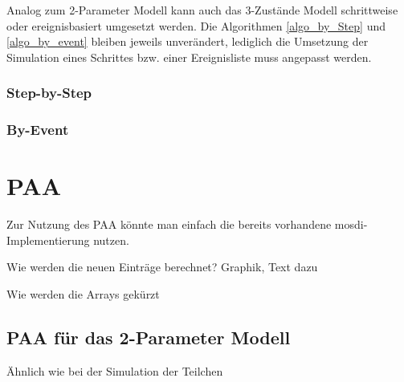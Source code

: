 Analog zum 2-Parameter Modell kann auch das 3-Zustände Modell schrittweise oder ereignisbasiert umgesetzt werden. Die Algorithmen \ref{algo_by_Step} und \ref{algo_by_event} bleiben jeweils unverändert, lediglich die Umsetzung der Simulation eines Schrittes bzw. einer Ereignisliste muss angepasst werden.

\subsubsection{Step-by-Step}


\subsubsection{By-Event}



\section{PAA}

Zur Nutzung des PAA könnte man einfach die bereits vorhandene mosdi-Implementierung nutzen. 

Wie werden die neuen Einträge berechnet? Graphik, Text dazu

Wie werden die Arrays gekürzt

\subsection{PAA für das 2-Parameter Modell}

Ähnlich wie bei der Simulation der Teilchen 

